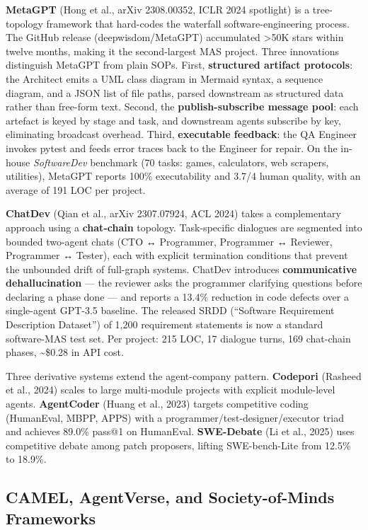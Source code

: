 \textbf{MetaGPT} (Hong et al., arXiv 2308.00352, ICLR 2024 spotlight) is a tree-topology framework that hard-codes the waterfall software-engineering process. The GitHub release (deepwisdom/MetaGPT) accumulated \textgreater50K stars within twelve months, making it the second-largest MAS project. Three innovations distinguish MetaGPT from plain SOPs. First, \textbf{structured artifact protocols}: the Architect emits a UML class diagram in Mermaid syntax, a sequence diagram, and a JSON list of file paths, parsed downstream as structured data rather than free-form text. Second, the \textbf{publish-subscribe message pool}: each artefact is keyed by stage and task, and downstream agents subscribe by key, eliminating broadcast overhead. Third, \textbf{executable feedback}: the QA Engineer invokes pytest and feeds error traces back to the Engineer for repair. On the in-house \emph{SoftwareDev} benchmark (70 tasks: games, calculators, web scrapers, utilities), MetaGPT reports 100\% executability and 3.7/4 human quality, with an average of 191 LOC per project.

\textbf{ChatDev} (Qian et al., arXiv 2307.07924, ACL 2024) takes a complementary approach using a \textbf{chat-chain} topology. Task-specific dialogues are segmented into bounded two-agent chats (CTO ↔ Programmer, Programmer ↔ Reviewer, Programmer ↔ Tester), each with explicit termination conditions that prevent the unbounded drift of full-graph systems. ChatDev introduces \textbf{communicative dehallucination} --- the reviewer asks the programmer clarifying questions before declaring a phase done --- and reports a 13.4\% reduction in code defects over a single-agent GPT-3.5 baseline. The released SRDD (``Software Requirement Description Dataset'') of 1,200 requirement statements is now a standard software-MAS test set. Per project: 215 LOC, 17 dialogue turns, 169 chat-chain phases, \textasciitilde\$0.28 in API cost.

Three derivative systems extend the agent-company pattern. \textbf{Codepori} (Rasheed et al., 2024) scales to large multi-module projects with explicit module-level agents. \textbf{AgentCoder} (Huang et al., 2023) targets competitive coding (HumanEval, MBPP, APPS) with a programmer/test-designer/executor triad and achieves 89.0\% pass@1 on HumanEval. \textbf{SWE-Debate} (Li et al., 2025) uses competitive debate among patch proposers, lifting SWE-bench-Lite from 12.5\% to 18.9\%.

\subsection{CAMEL, AgentVerse, and Society-of-Minds Frameworks}\label{camel-agentverse-and-society-of-minds-frameworks}

